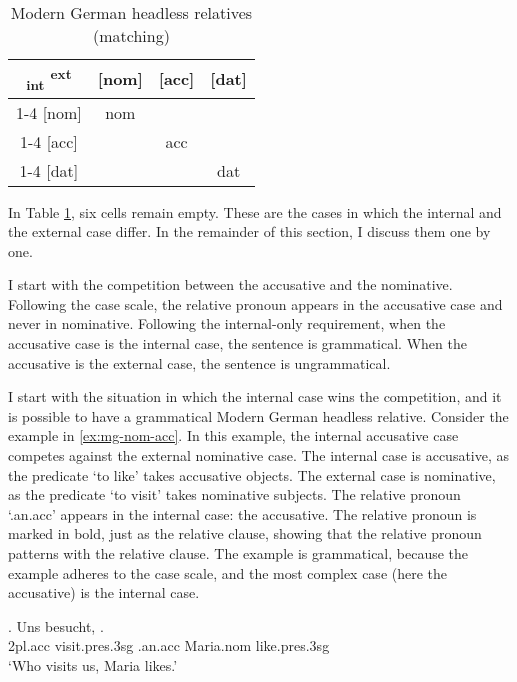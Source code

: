 \begin{table}[ht]
 \center
 \caption{Modern German headless relatives (matching)}
 \begin{tabular}{c|c|c|c}
   \toprule
    \textsubscript{\ac{int}} \textsuperscript{\ac{ext}}
         & [\ac{nom}]
         & [\ac{acc}]
         & [\ac{dat}]
         \\ \cmidrule{1-4}
     [\ac{nom}]
         & \colorbox{LG}{\ac{nom}}
         &
         &
         \\ \cmidrule{1-4}
     [\ac{acc}]
         &
         & \colorbox{DG}{\ac{acc}}
         &
         \\ \cmidrule{1-4}
     [\ac{dat}]
         &
         &
         & \ac{dat}
         \\
   \bottomrule
 \end{tabular}
   \label{tbl:summary-mg-matching}
\end{table}

In Table \ref{tbl:summary-mg-matching}, six cells remain empty. These are the cases in which the internal and the external case differ. In the remainder of this section, I discuss them one by one.

I start with the competition between the accusative and the nominative. Following the case scale, the relative pronoun appears in the accusative case and never in nominative. Following the internal-only requirement, when the accusative case is the internal case, the sentence is grammatical. When the accusative is the external case, the sentence is ungrammatical.

I start with the situation in which the internal case wins the competition, and it is possible to have a grammatical Modern German headless relative.
Consider the example in \ref{ex:mg-nom-acc}. In this example, the internal accusative case competes against the external nominative case.
The internal case is accusative, as the predicate  `to like' takes accusative objects.
The external case is nominative, as the predicate  `to visit' takes nominative subjects.
The relative pronoun  `.\ac{an}.\ac{acc}' appears in the internal case: the accusative. The relative pronoun is marked in bold, just as the relative clause, showing that the relative pronoun patterns with the relative clause.
The example is grammatical, because the example adheres to the case scale, and the most complex case (here the accusative) is the internal case.

\exg. Uns besucht,   .\\
 2\ac{pl}.\ac{acc} visit.\ac{pres}.3\ac{sg}\scsub{[nom]} .\ac{an}.\ac{acc} Maria.\ac{nom} like.\ac{pres}.3\ac{sg}\scsub{[acc]}\\
 `Who visits us, Maria likes.' \label{ex:mg-nom-acc}

